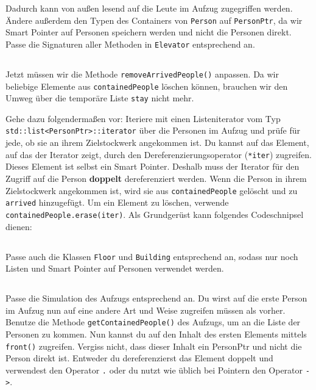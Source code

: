 
Dadurch kann von außen lesend auf die Leute im Aufzug zugegriffen werden.
Ändere außerdem den Typen des Containers von \lstinline{Person} auf \lstinline{PersonPtr}, da wir Smart Pointer auf Personen speichern werden und nicht die Personen direkt.
Passe die Signaturen aller Methoden in \lstinline{Elevator} entsprechend an.

\subsection{}
Jetzt müssen wir die Methode \lstinline{removeArrivedPeople()} anpassen.
Da wir beliebige Elemente aus \lstinline{containedPeople} löschen können, brauchen wir den Umweg über die temporäre Liste \lstinline{stay} nicht mehr.

Gehe dazu folgendermaßen vor:
Iteriere mit einen Listeniterator vom Typ \lstinline{std::list<PersonPtr>::iterator} über die Personen im Aufzug und prüfe für jede, ob sie an ihrem Zielstockwerk angekommen ist.
Du kannst auf das Element, auf das der Iterator zeigt, durch den Dereferenzierungsoperator (\lstinline{*iter}) zugreifen.
Dieses Element ist selbst ein Smart Pointer.
Deshalb muss der Iterator für den Zugriff auf die Person \textbf{doppelt} dereferenziert werden.
Wenn die Person in ihrem Zielstockwerk angekommen ist, wird sie aus \lstinline{containedPeople} gelöscht und zu \lstinline{arrived} hinzugefügt.
Um ein Element zu löschen, verwende \lstinline{containedPeople.erase(iter)}.
%
%
Als Grundgerüst kann folgendes Codeschnipsel dienen:


\subsection{}
Passe auch die Klassen \lstinline{Floor} und \lstinline{Building} entsprechend an, sodass nur noch Listen und Smart Pointer auf Personen verwendet werden.

\subsection{}
Passe die Simulation des Aufzugs entsprechend an.
Du wirst auf die erste Person im Aufzug nun auf eine andere Art und Weise zugreifen müssen als vorher.
Benutze die Methode \lstinline{getContainedPeople()} des Aufzugs, um an die Liste der Personen zu kommen.
Nun kannst du auf den Inhalt des ersten Elements mittels \lstinline{front()} zugreifen.
Vergiss nicht, dass dieser Inhalt ein PersonPtr und nicht die Person direkt ist.
Entweder du dereferenzierst das Element doppelt und verwendest den Operator \lstinline{.} oder du nutzt wie üblich bei Pointern den Operator \lstinline{->}.

